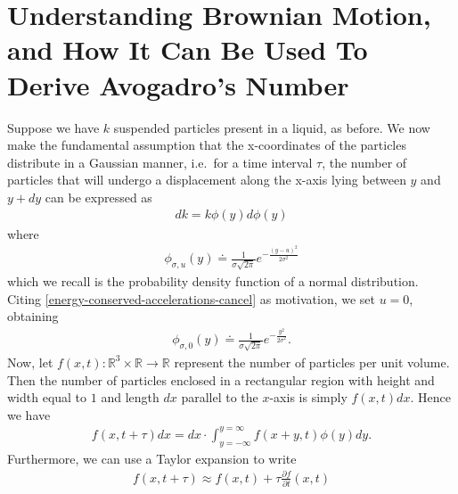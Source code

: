 \documentclass[12pt,reqno]{amsart}
\newcommand{\rr}{\mathbb{R}}
\newcommand{\p}{\partial}
\theoremstyle{plain}  %
\theoremstyle{definition}
\begin{document}
\section{Understanding Brownian Motion, and How It Can Be Used To Derive Avogadro's
  Number}
Suppose we have $k$ suspended particles present in a liquid, as before. We now make the
fundamental assumption that the x-coordinates of the particles distribute in a Gaussian
manner, i.e.\ for a time interval $\tau$, the number of particles that will undergo a displacement along the x-axis lying
between $y$ and $y + dy$ can be
expressed as
\begin{equation*}
  \begin{split}
    dk = k \phi(y) d\phi(y)
    \label{1}
  \end{split}
\end{equation*}
where 
\begin{equation*}
  \begin{split}
    \phi_{\sigma, u}(y) \doteq \frac{1}{\sigma \sqrt{2 \pi}} e^{-\frac{(y-u)^2}{2 \sigma^2}}
  \end{split}
\end{equation*}
which we recall is the probability density function of a normal
distribution. Citing \eqref{energy-conserved-accelerations-cancel} as motivation,
we set $u = 0$, obtaining 
\begin{equation}
  \begin{split}
    \phi_{\sigma, 0}(y) \doteq \frac{1}{\sigma \sqrt{2 \pi}} e^{-\frac{y^2}{2 \sigma^2}}.
    \label{2}
  \end{split}
\end{equation}
Now, let $f(x,t): \rr^3 \times \rr \to \rr$ represent the number of particles per unit volume. Then
the number of particles enclosed in a rectangular region with height and width equal
to $1$ and length $dx$ parallel to the $x$-axis is simply $f(x,t) dx$. Hence we have
\begin{equation}
  \begin{split}
    f(x,t + \tau) dx = dx \cdot \int_{y=-\infty}^{y=\infty} f(x+y, t) \phi(y) dy.
    \label{3}
  \end{split}
\end{equation}
Furthermore, we can use a Taylor expansion to write
\begin{equation}
  \begin{split}
    f(x, t + \tau) \approx f(x,t) + \tau \frac{\p f}{\p t}(x,t)
    \label{4}
  \end{split}
\end{equation}
\end{document}
